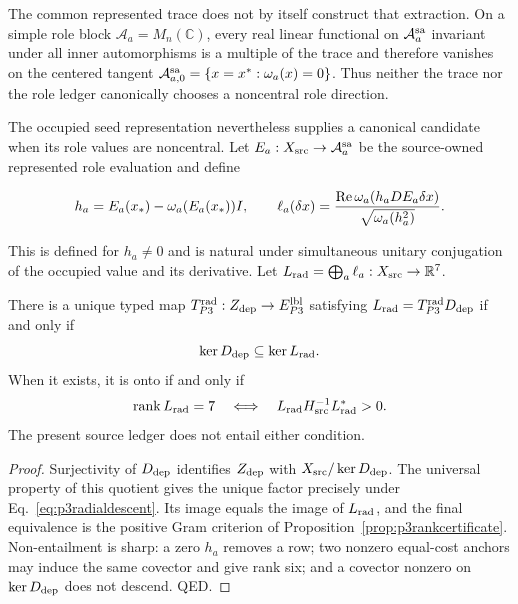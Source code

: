 The common represented trace does not by itself construct that extraction.
On a simple role block $\mathcal A_a=M_n(\mathbb C)$, every real linear
functional on $\mathcal A_a^{\rm sa}$ invariant under all inner
automorphisms is a multiple of the trace and therefore vanishes on the
centered tangent
$\mathcal A_{a,0}^{\rm sa}=\{x=x^*: \omega_a(x)=0\}$.  Thus neither the
trace nor the role ledger canonically chooses a noncentral role direction.

The occupied seed representation nevertheless supplies a canonical
candidate when its role values are noncentral.  Let
$E_a:X_{\rm src}\to\mathcal A_a^{\rm sa}$ be the source-owned represented
role evaluation and define

\begin{equation}
h_a=E_a(x_*)-\omega_a(E_a(x_*))I,
\qquad
\ell_a(\delta x)=
{\operatorname{Re}\omega_a(h_aD E_a\delta x)
 \over \sqrt{\omega_a(h_a^2)}}.
\label{eq:p3radialcovector}
\end{equation}

This is defined for $h_a\ne0$ and is natural under simultaneous unitary
conjugation of the occupied value and its derivative.  Let
$L_{\rm rad}=\bigoplus_a\ell_a:X_{\rm src}\to\mathbb R^7$.

\begin{proposition}
\label{prop:p3radialextraction}
There is a unique typed map
$T_{P3}^{\rm rad}:Z_{\rm dep}\to E_{P3}^{\rm lbl}$ satisfying
$L_{\rm rad}=T_{P3}^{\rm rad}D_{\rm dep}$ if and only if
\begin{equation}
\ker D_{\rm dep}\subseteq\ker L_{\rm rad}.
\label{eq:p3radialdescent}
\end{equation}
When it exists, it is onto if and only if
\begin{equation}
\operatorname{rank}L_{\rm rad}=7
\quad\Longleftrightarrow\quad
L_{\rm rad}H_{\rm src}^{-1}L_{\rm rad}^{*}>0.
\label{eq:p3radialgram}
\end{equation}
The present source ledger does not entail either condition.
\end{proposition}

\begin{proof}
Surjectivity of $D_{\rm dep}$ identifies $Z_{\rm dep}$ with
$X_{\rm src}/\ker D_{\rm dep}$.  The universal property of this quotient
gives the unique factor precisely under
Eq.~\eqref{eq:p3radialdescent}.  Its image equals the image of
$L_{\rm rad}$, and the final equivalence is the positive Gram criterion of
Proposition~\ref{prop:p3rankcertificate}.  Non-entailment is sharp: a zero
$h_a$ removes a row; two nonzero equal-cost anchors may induce the same
covector and give rank six; and a covector nonzero on $\ker D_{\rm dep}$
does not descend.  QED.
\end{proof}

